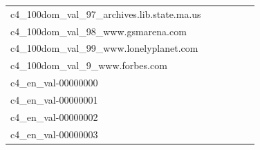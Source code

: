 \documentclass[dvipsnames]{article}
\begin{document}
\begin{appendix}
{\begin{longtable}{m{6cm}m{1.7cm}m{1.7cm}m{1.7cm}m{1.7cm}m{1.7cm}}
	c4\_100dom\_val\_97\_archives.lib.state.ma.us  & \colorbox[HTML]{fefee2}{\makebox[\mywidth][c]{6.53}} & \colorbox[HTML]{f3fab6}{\makebox[\mywidth][c]{6.12}} & \colorbox[HTML]{ffffe5}{\makebox[\mywidth][c]{7.09}} & \colorbox[HTML]{fbfdd0}{\makebox[\mywidth][c]{6.27}} & \colorbox[HTML]{77c578}{\makebox[\mywidth][c]{5.85}}\\
	c4\_100dom\_val\_98\_www.gsmarena.com  & \colorbox[HTML]{fefee0}{\makebox[\mywidth][c]{23.21}} & \colorbox[HTML]{ddf1a6}{\makebox[\mywidth][c]{22.15}} & \colorbox[HTML]{ffffe5}{\makebox[\mywidth][c]{24.52}} & \colorbox[HTML]{d5eea1}{\makebox[\mywidth][c]{22.10}} & \colorbox[HTML]{77c578}{\makebox[\mywidth][c]{21.76}}\\
	c4\_100dom\_val\_99\_www.lonelyplanet.com  & \colorbox[HTML]{fcfed8}{\makebox[\mywidth][c]{11.33}} & \colorbox[HTML]{def2a6}{\makebox[\mywidth][c]{10.92}} & \colorbox[HTML]{ffffe5}{\makebox[\mywidth][c]{12.28}} & \colorbox[HTML]{c5e799}{\makebox[\mywidth][c]{10.84}} & \colorbox[HTML]{77c578}{\makebox[\mywidth][c]{10.69}}\\
	c4\_100dom\_val\_9\_www.forbes.com  & \colorbox[HTML]{fcfed7}{\makebox[\mywidth][c]{13.72}} & \colorbox[HTML]{d1ec9f}{\makebox[\mywidth][c]{13.31}} & \colorbox[HTML]{ffffe5}{\makebox[\mywidth][c]{14.63}} & \colorbox[HTML]{dbf1a4}{\makebox[\mywidth][c]{13.34}} & \colorbox[HTML]{77c578}{\makebox[\mywidth][c]{13.13}}\\
	c4\_en\_val-00000000  & \colorbox[HTML]{ffffe5}{\makebox[\mywidth][c]{14.34}} & \colorbox[HTML]{e5f5ac}{\makebox[\mywidth][c]{13.70}} & \colorbox[HTML]{ffffe5}{\makebox[\mywidth][c]{14.87}} & \colorbox[HTML]{e0f2a8}{\makebox[\mywidth][c]{13.67}} & \colorbox[HTML]{77c578}{\makebox[\mywidth][c]{13.46}}\\
	c4\_en\_val-00000001  & \colorbox[HTML]{fefee2}{\makebox[\mywidth][c]{14.86}} & \colorbox[HTML]{d8efa2}{\makebox[\mywidth][c]{14.28}} & \colorbox[HTML]{ffffe5}{\makebox[\mywidth][c]{15.51}} & \colorbox[HTML]{bfe596}{\makebox[\mywidth][c]{14.21}} & \colorbox[HTML]{77c578}{\makebox[\mywidth][c]{14.09}}\\
	c4\_en\_val-00000002  & \colorbox[HTML]{fefee2}{\makebox[\mywidth][c]{15.29}} & \colorbox[HTML]{dbf1a4}{\makebox[\mywidth][c]{14.71}} & \colorbox[HTML]{ffffe5}{\makebox[\mywidth][c]{15.95}} & \colorbox[HTML]{dcf1a5}{\makebox[\mywidth][c]{14.71}} & \colorbox[HTML]{77c578}{\makebox[\mywidth][c]{14.51}}\\
	c4\_en\_val-00000003  & \colorbox[HTML]{ffffe5}{\makebox[\mywidth][c]{12.95}} & \colorbox[HTML]{e8f6ae}{\makebox[\mywidth][c]{12.28}} & \colorbox[HTML]{ffffe5}{\makebox[\mywidth][c]{13.32}} & \colorbox[HTML]{dbf1a4}{\makebox[\mywidth][c]{12.23}} & \colorbox[HTML]{77c578}{\makebox[\mywidth][c]{12.06}}\\

\end{longtable}}
\end{appendix}
\end{document}
